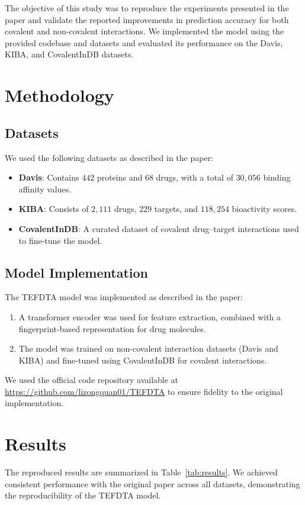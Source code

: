 \documentclass{article}
\begin{document}
The objective of this study was to reproduce the experiments presented in the paper and validate the reported improvements in prediction accuracy for both covalent and non-covalent interactions. We implemented the model using the provided codebase and datasets and evaluated its performance on the Davis, KIBA, and CovalentInDB datasets.

\section{Methodology}
\subsection{Datasets}
We used the following datasets as described in the paper:
\begin{itemize}
	\item \textbf{Davis}: Contains $442$ proteins and $68$ drugs, with a total of $30,056$ binding affinity values.
	\item \textbf{KIBA}: Consists of $2,111$ drugs, $229$ targets, and $118,254$ bioactivity scores.
	\item \textbf{CovalentInDB}: A curated dataset of covalent drug–target interactions used to fine-tune the model.
\end{itemize}

\subsection{Model Implementation}
The TEFDTA model was implemented as described in the paper:
\begin{enumerate}
	\item A transformer encoder was used for feature extraction, combined with a fingerprint-based representation for drug molecules.
	\item The model was trained on non-covalent interaction datasets (Davis and KIBA) and fine-tuned using CovalentInDB for covalent interactions.
\end{enumerate}

We used the official code repository available at \url{https://github.com/lizongquan01/TEFDTA} to ensure fidelity to the original implementation.

\section{Results}
The reproduced results are summarized in Table~\ref{tab:results}. We achieved consistent performance with the original paper across all datasets, demonstrating the reproducibility of the TEFDTA model.
\end{document}
